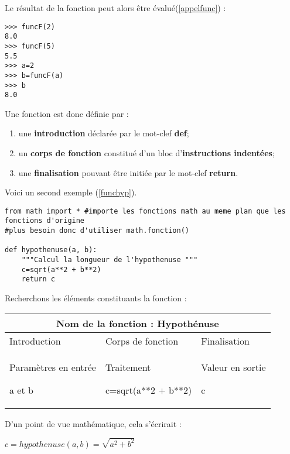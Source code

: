 Le résultat de la fonction peut alors être évalué(\ref{appelfunc}) :
\begin{lstlisting}[frame=lines,caption={l'appel à une fonction},label=appelfunc]
>>> funcF(2)
8.0
>>> funcF(5)
5.5
>>> a=2
>>> b=funcF(a)
>>> b
8.0
\end{lstlisting}


\begin{defi}

Une fonction est donc définie par :
\begin{enumerate}
\item une \textbf{introduction} déclarée par le mot-clef \textbf{def};
\item un \textbf{corps de fonction} constitué d'un bloc d'\textbf{instructions indentées};
\item une \textbf{finalisation} pouvant être initiée par le mot-clef \textbf{return}.

\end{enumerate}

\end{defi}

Voici un second exemple  (\ref{funchyp}).
\begin{lstlisting}[frame=lines,caption={Une seconde fonction},label=funchyp]
from math import * #importe les fonctions math au meme plan que les fonctions d'origine
#plus besoin donc d'utiliser math.fonction()

def hypothenuse(a, b):
	"""Calcul la longueur de l'hypothenuse """
	c=sqrt(a**2 + b**2)
	return c
\end{lstlisting}

Recherchons les éléments constituants la fonction :

\begin{center}
\begin{tabular}{|p{4cm}|p{4cm}|p{4cm}|}
\hline
\multicolumn{3}{|c|}{Nom de la fonction : Hypothénuse}\\
\hline
Introduction & Corps de fonction & Finalisation\\
\hline
Paramètres en entrée 

a et b & 
Traitement

c=sqrt(a**2 + b**2)& Valeur en sortie 

c\\
\hline
\end{tabular}
\end{center}

D'un point de vue mathématique, cela s'écrirait :
\begin{center}
$c=hypothenuse(a,b)=\sqrt{a^2+b^2}$
\end{center}


